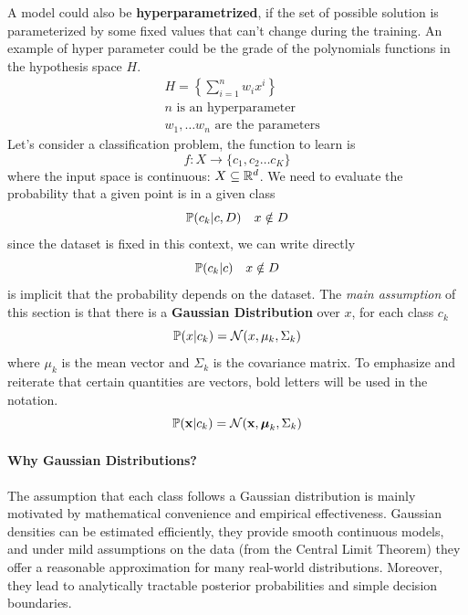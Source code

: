 \documentclass[10pt, letterpaper]{report}
\begin{document}
\bigskip
A model could also be \textbf{hyperparametrized}, if the set of possible solution is parameterized by some fixed values that can't change during the training. An example of hyper parameter could be the grade of the polynomials functions in the hypothesis space $H$.
\begin{align*}
	 & H=\left\{\sum_{i=1}^nw_ix^i\right\}     \\
	 & n\text{ is an hyperparameter}           \\
	 & w_1,\dots w_n\text{ are the parameters}
\end{align*}
Let's consider a classification problem, the function to learn is\begin{equation}
	f:X\rightarrow\{c_1,c_2\dots c_K\}
\end{equation}
where the input space is continuous: $X\subseteq{\mathbb R}^d$. We need to evaluate the probability that a given point is in a given class\begin{equation}
	{\mathbb P}(c_k|c,D) \ \ \ x\notin D
\end{equation}
since the dataset is fixed in this context, we can write directly \begin{equation}
	{\mathbb P}(c_k|c) \ \ \ x\notin D
\end{equation}
is implicit that the probability depends on the dataset. The \textit{main assumption} of this section is that there is a \textbf{Gaussian Distribution} over $x$, for each class $c_k$
\begin{equation}
	{\mathbb P}(x|c_k)=\mathcal N(x,\mu_k,\Sigma_k)
\end{equation}
where $\mu_k$ is the mean vector and $\Sigma_k$ is the covariance matrix. To emphasize and reiterate that certain quantities are vectors, bold letters will be used in the notation.
\begin{equation}
	{\mathbb P}(\mathbf x|c_k)=\mathcal N(\mathbf  x,{\boldsymbol{\mu}}_k,\Sigma_k)
\end{equation}

\paragraph{Why Gaussian Distributions?}
The assumption that each class follows a Gaussian distribution is mainly motivated by mathematical convenience and empirical effectiveness.
Gaussian densities can be estimated efficiently, they provide smooth continuous models, and under mild assumptions on the data (from the Central Limit Theorem) they offer a reasonable approximation for many real-world distributions.
Moreover, they lead to analytically tractable posterior probabilities and simple decision boundaries.
\end{document}
